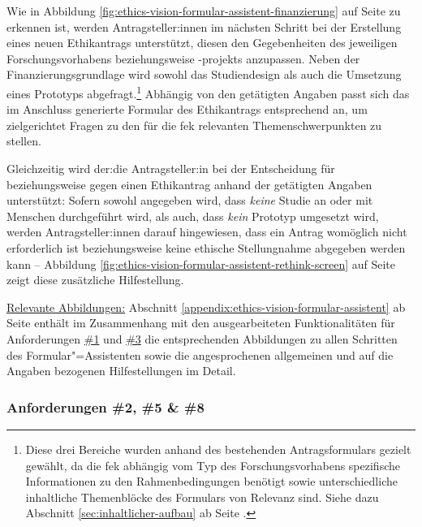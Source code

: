 \documentclass[a4paper,12pt,twoside,numbers=noendperiod]{scrreprt}
\begin{document}
Wie in Abbildung \ref{fig:ethics-vision-formular-assistent-finanzierung} auf Seite \pageref{fig:ethics-vision-formular-assistent-finanzierung} zu erkennen ist, werden Antragsteller:innen im nächsten Schritt bei der Erstellung eines neuen Ethikantrags unterstützt, diesen den Gegebenheiten des jeweiligen Forschungsvorhabens beziehungsweise -projekts anzupassen. Neben der Finanzierungsgrundlage wird sowohl das Studiendesign als auch die Umsetzung eines Prototyps abgefragt.\footnote{Diese drei Bereiche wurden anhand des bestehenden Antragsformulars gezielt gewählt, da die \ac{fek} abhängig vom Typ des Forschungsvorhabens spezifische Informationen zu den Rahmenbedingungen benötigt sowie unterschiedliche inhaltliche Themenblöcke des Formulars von Relevanz sind. Siehe dazu Abschnitt \ref{sec:inhaltlicher-aufbau} ab Seite \pageref{sec:inhaltlicher-aufbau}.} Abhängig von den getätigten Angaben passt sich das im Anschluss generierte Formular des Ethikantrags entsprechend an, um zielgerichtet Fragen zu den für die \ac{fek} relevanten Themenschwerpunkten zu stellen.

Gleichzeitig wird der:die Antragsteller:in bei der Entscheidung für beziehungsweise gegen einen Ethikantrag anhand der getätigten Angaben unterstützt: Sofern sowohl angegeben wird, dass \textit{keine} Studie an oder mit Menschen durchgeführt wird, als auch, dass \textit{kein} Prototyp umgesetzt wird, werden Antragsteller:innen darauf hingewiesen, dass ein Antrag womöglich nicht erforderlich ist beziehungsweise keine ethische Stellungnahme abgegeben werden kann -- Abbildung \ref{fig:ethics-vision-formular-assistent-rethink-screen} auf Seite \pageref{fig:ethics-vision-formular-assistent-rethink-screen} zeigt diese zusätzliche Hilfestellung.

\medskip

\noindent\underline{Relevante Abbildungen:} Abschnitt \ref{appendix:ethics-vision-formular-assistent} ab Seite \pageref{appendix:ethics-vision-formular-assistent} enthält im Zusammenhang mit den ausgearbeiteten Funktionalitäten für Anforderungen \hyperref[sub-sub-sec:abgeleitete-anforderungen-vorfeld-antrag]{\#1} und \hyperref[sub-sub-sec:abgeleitete-anforderungen-während-erstellung-einreichung]{\#3} die entsprechenden Abbildungen zu allen Schritten des Formular"=Assistenten sowie die angesprochenen allgemeinen und auf die Angaben bezogenen Hilfestellungen im Detail.

\subsubsection*{Anforderungen \#2, \#5 \& \#8}
\label{sub-sub-sec:umgesetzte-funktionalitäten-anforderung-2-5-8}
\end{document}

